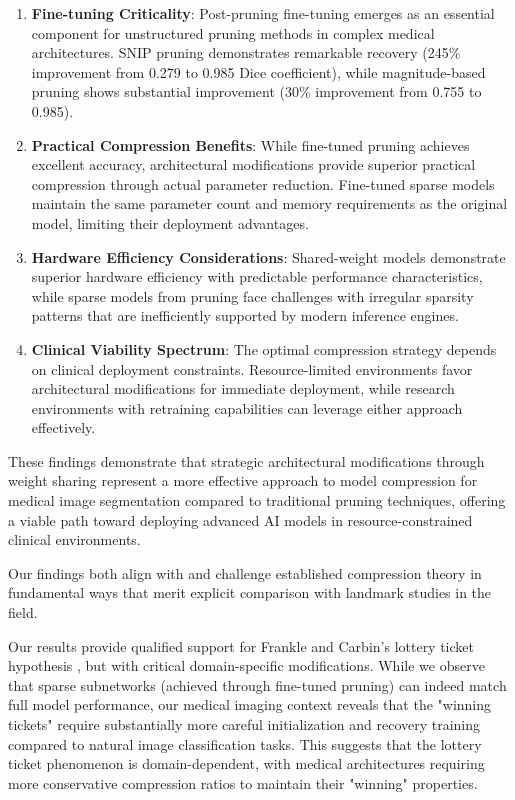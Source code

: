\documentclass[12pt,a4paper]{article}
\begin{document}
\begin{enumerate}
\begin{enumerate}
\item \textbf{Fine-tuning Criticality}: Post-pruning fine-tuning emerges as an essential component for unstructured pruning methods in complex medical architectures. SNIP pruning demonstrates remarkable recovery (245\% improvement from 0.279 to 0.985 Dice coefficient), while magnitude-based pruning shows substantial improvement (30\% improvement from 0.755 to 0.985).

\item \textbf{Practical Compression Benefits}: While fine-tuned pruning achieves excellent accuracy, architectural modifications provide superior practical compression through actual parameter reduction. Fine-tuned sparse models maintain the same parameter count and memory requirements as the original model, limiting their deployment advantages.

\item \textbf{Hardware Efficiency Considerations}: Shared-weight models demonstrate superior hardware efficiency with predictable performance characteristics, while sparse models from pruning face challenges with irregular sparsity patterns that are inefficiently supported by modern inference engines.

\item \textbf{Clinical Viability Spectrum}: The optimal compression strategy depends on clinical deployment constraints. Resource-limited environments favor architectural modifications for immediate deployment, while research environments with retraining capabilities can leverage either approach effectively.
\end{enumerate}

These findings demonstrate that strategic architectural modifications through weight sharing represent a more effective approach to model compression for medical image segmentation compared to traditional pruning techniques, offering a viable path toward deploying advanced AI models in resource-constrained clinical environments.

Our findings both align with and challenge established compression theory in fundamental ways that merit explicit comparison with landmark studies in the field.

Our results provide qualified support for Frankle and Carbin's lottery ticket hypothesis \cite{Frankle2019Lottery}, but with critical domain-specific modifications. While we observe that sparse subnetworks (achieved through fine-tuned pruning) can indeed match full model performance, our medical imaging context reveals that the "winning tickets" require substantially more careful initialization and recovery training compared to natural image classification tasks. This suggests that the lottery ticket phenomenon is domain-dependent, with medical architectures requiring more conservative compression ratios to maintain their "winning" properties.


\end{enumerate}
\end{document}
